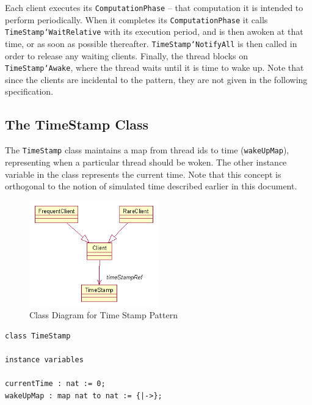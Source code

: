 \documentclass{overturerepchap}
\begin{document}
Each client executes its
\texttt{ComputationPhase} -- that computation it is intended to perform
periodically. When it completes its \texttt{ComputationPhase} it calls 
\texttt{TimeStamp`WaitRelative} with its
execution period, and is then awoken at that time, or as soon as
possible thereafter. \texttt{TimeStamp`NotifyAll} 
is then called in order to release any waiting clients. Finally, the thread 
blocks on \texttt{TimeStamp`Awake}, where the thread waits until it 
is time to wake up. Note that since the clients are incidental to the 
pattern, they are not given in the following specification.

\subsection{The TimeStamp Class}

The \texttt{TimeStamp} class maintains a map from thread ids to 
time (\texttt{wakeUpMap}), representing when a particular thread 
should be woken. The other instance variable in the class
represents the current time. Note that this concept is orthogonal to
the notion of simulated time described earlier in this document.

\begin{figure}
\begin{center}
\includegraphics[width=0.5\textwidth]{figures/timestamp.png}
\end{center}
\caption{Class Diagram for Time Stamp Pattern\label{fig:classtimestamp}}
\end{figure}


\begin{lstlisting}
class TimeStamp

instance variables
  
currentTime : nat := 0;
wakeUpMap : map nat to nat := {|->};
\end{lstlisting}
\end{document}
